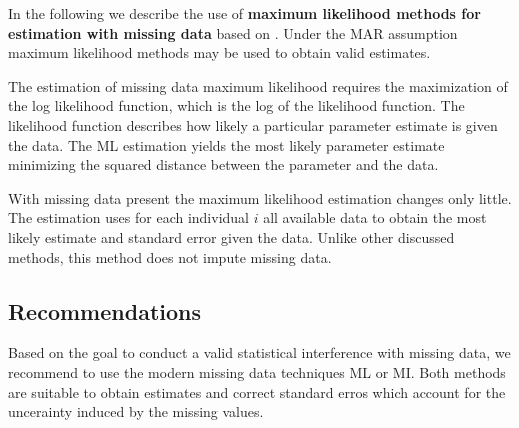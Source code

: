 In the following we describe the use of \textbf{maximum likelihood methods for estimation with missing data} based on \cite{Enders06}. 
Under the MAR assumption maximum likelihood methods may be used to obtain valid estimates. \par
 The estimation of missing data maximum likelihood requires the maximization of the log likelihood function, which is the log of the likelihood function. The likelihood function describes how likely a particular parameter estimate is given the data. The ML estimation yields the most likely parameter estimate minimizing the squared distance between the parameter and the data. \par With missing data present the maximum likelihood estimation changes only little. The estimation uses for each individual $i$ all available data to obtain the most likely estimate and standard error given the data. Unlike other discussed methods, this method does not impute missing data. 
 \subsection{Recommendations}
 Based on the goal to conduct a valid statistical interference with missing data, we recommend to use the modern missing data techniques ML or MI. Both methods are suitable to obtain estimates and correct standard erros which account for the uncerainty induced by the missing values.
